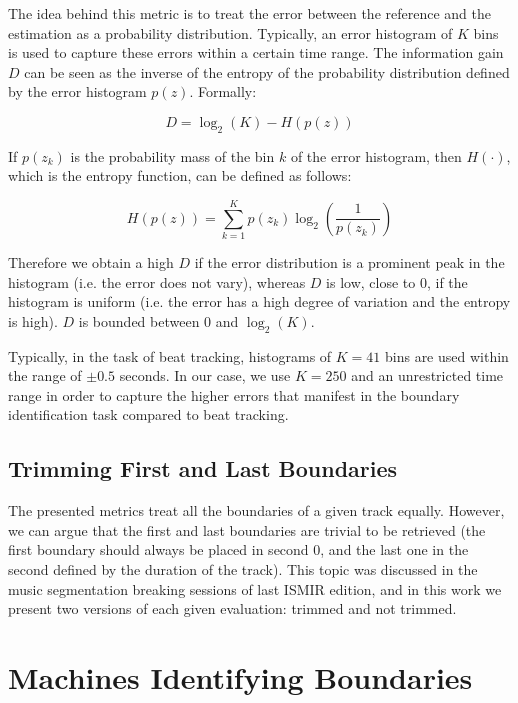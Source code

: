 \documentclass{article}
\begin{document}
The idea behind this metric is to treat the error between the reference and the estimation as a probability distribution.
Typically, an error histogram of $K$ bins is used to capture these errors within a certain time range.
The information gain $D$ can be seen as the inverse of the entropy of the probability distribution defined by the error histogram $p(z)$. Formally:

\begin{equation}
  D = \log_2(K) - H(p(z))
\end{equation}

If $p(z_k)$ is the probability mass of the bin $k$ of the error histogram, then $H(\cdot)$, which is the entropy function, can be defined as follows:

\begin{equation}
  H(p(z)) = \sum_{k=1}^K p(z_k) \log_2 \left( \frac{1}{p(z_k)} \right)
\end{equation}

Therefore we obtain a high $D$ if the error distribution is a prominent peak in the histogram (i.e. the error does not vary), whereas $D$ is low, close to 0, if the histogram is uniform (i.e. the error has a high degree of variation and the entropy is high).
$D$ is bounded between 0 and $\log_2(K)$.

Typically, in the task of beat tracking, histograms of $K=41$ bins are used within the range of $\pm0.5$ seconds.
In our case, we use $K=250$ and an unrestricted time range in order to capture the higher errors that manifest in the boundary identification task compared to beat tracking.

\subsection{Trimming First and Last Boundaries}

The presented metrics treat all the boundaries of a given track equally. 
However, we can argue that the first and last boundaries are trivial to be retrieved (the first boundary should always be placed in second 0, and the last one in the second defined by the duration of the track). 
This topic was discussed in the music segmentation breaking sessions of last ISMIR edition\cite{Nieto2013}, and in this work we present two versions of each given evaluation: trimmed and not trimmed.

\section{Machines Identifying Boundaries}\label{sec:eval_desc}
\end{document}
